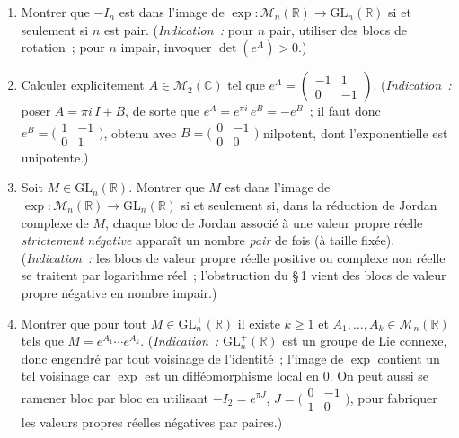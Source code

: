 \begin{mdframed}[style=exobar]
  \begin{enumerate}
    \item Montrer que $-I_n$ est dans l'image de $\exp: \mathcal{M}_n(\mathbb{R})
          \to \mathrm{GL}_n(\mathbb{R})$ si et seulement si $n$ est pair.
          (\textit{Indication~:} pour $n$ pair, utiliser des blocs de rotation~;
          pour $n$ impair, invoquer $\det(e^A) > 0$.)

    \item Calculer explicitement $A \in \mathcal{M}_2(\mathbb{C})$ tel que
          $e^A = \begin{pmatrix}-1&1\\0&-1\end{pmatrix}$.
          (\textit{Indication~:} poser $A = \pi i\,I + B$, de sorte que
          $e^A = e^{\pi i}\,e^B = -e^B$~; il faut donc
          $e^B = \bigl(\begin{smallmatrix}1&-1\\0&1\end{smallmatrix}\bigr)$,
          obtenu avec $B = \bigl(\begin{smallmatrix}0&-1\\0&0\end{smallmatrix}\bigr)$
          nilpotent, dont l'exponentielle est unipotente.)

    \item Soit $M \in \mathrm{GL}_n(\mathbb{R})$. Montrer que $M$ est dans
          l'image de $\exp : \mathcal{M}_n(\mathbb{R}) \to \mathrm{GL}_n(\mathbb{R})$
          si et seulement si, dans la réduction de Jordan complexe de $M$,
          chaque bloc de Jordan associé à une valeur propre réelle
          \emph{strictement négative} apparaît un nombre \emph{pair} de fois
          (à taille fixée). (\textit{Indication~:} les blocs de valeur propre
          réelle positive ou complexe non réelle se traitent par logarithme
          réel~; l'obstruction du §\,1 vient des blocs de valeur propre
          négative en nombre impair.)

    \item Montrer que pour tout $M \in \mathrm{GL}_n^+(\mathbb{R})$ il existe
          $k \geq 1$ et $A_1, \ldots, A_k \in \mathcal{M}_n(\mathbb{R})$
          tels que $M = e^{A_1}\cdots e^{A_k}$.
          (\textit{Indication~:} $\mathrm{GL}_n^+(\mathbb{R})$ est un groupe
          de Lie connexe, donc engendré par tout voisinage de l'identité~;
          l'image de $\exp$ contient un tel voisinage car $\exp$ est un
          difféomorphisme local en $0$. On peut aussi se ramener bloc par
          bloc en utilisant $-I_2 = e^{\pi J}$,
          $J = \bigl(\begin{smallmatrix}0&-1\\1&0\end{smallmatrix}\bigr)$,
          pour fabriquer les valeurs propres réelles négatives par paires.)


\end{enumerate}
\end{mdframed}
